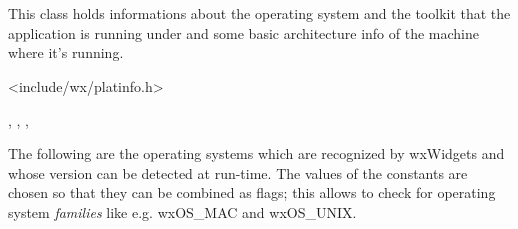 
\section{}\label{wxplatforminfo}

This class holds informations about the operating system and the toolkit that the application
is running under and some basic architecture info of the machine where it's running.




<include/wx/platinfo.h>


, ,
, 


The following are the operating systems which are recognized by wxWidgets
and whose version can be detected at run-time. The values of the constants
are chosen so that they can be combined as flags; this allows to check
for operating system {\it families} like e.g. wxOS\_MAC and wxOS\_UNIX.

